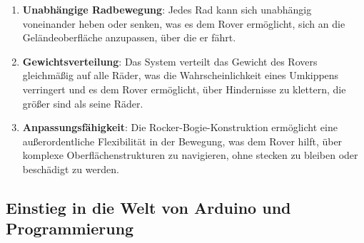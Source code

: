 \documentclass{vorlage-design-main}
\begin{document}
\begin{enumerate}
\def\labelenumi{\arabic{enumi}.}

\item
  \textbf{Unabhängige Radbewegung}: Jedes Rad kann sich unabhängig
  voneinander heben oder senken, was es dem Rover ermöglicht, sich an
  die Geländeoberfläche anzupassen, über die er fährt.
\item
  \textbf{Gewichtsverteilung}: Das System verteilt das Gewicht des
  Rovers gleichmäßig auf alle Räder, was die Wahrscheinlichkeit eines
  Umkippens verringert und es dem Rover ermöglicht, über Hindernisse zu
  klettern, die größer sind als seine Räder.
\item
  \textbf{Anpassungsfähigkeit}: Die Rocker-Bogie-Konstruktion ermöglicht
  eine außerordentliche Flexibilität in der Bewegung, was dem Rover
  hilft, über komplexe Oberflächenstrukturen zu navigieren, ohne stecken
  zu bleiben oder beschädigt zu werden.
\end{enumerate}

\hypertarget{einstieg-in-die-welt-von-arduino-und-programmierung}{%
\subsection{Einstieg in die Welt von Arduino und
Programmierung}\label{einstieg-in-die-welt-von-arduino-und-programmierung}}
\end{document}
